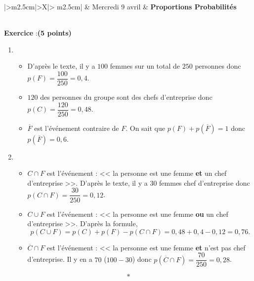 \documentclass[10pt,french]{article}
\newcounter{exoc}
\newenvironment{exoc}[1]{%
  \refstepcounter{exoc}\textbf{Exercice \theexoc} :\hfill {\footnotesize\textbf{(#1)}}\par
  \medskip}%
{\medskip}
\begin{document}
\begin{center}
\begin{tabularx}{\textwidth}{|>\centering m{2.5cm}|>\centering X|>{\centering\arraybackslash} m{2.5cm}|}
	\iere {} &  Mercredi 9 avril  & \textbf{Proportions Probabilités} \\
	\hline
		 \\
	\hline
\end{tabularx}
\end{center}\bigskip

\begin{exoc}{5 points}
\begin{enumerate}
		\item
			\begin{itemize}[label=$\star$] 
				\item D'après le texte, il y a $100$ femmes sur un total  de $250$ personnes donc $p(F) = \dfrac{100}{250} = 0,4$.
				\item $120$ des personnes du groupe sont des chefs d'entreprise donc $p(C) = \dfrac{120}{250} = 0,48$.
				\item $\overline F$ est l'événement contraire de $F$. On sait que $p(F) + p\left(\overline{F}\right) = 1$ donc $p\left(\overline{F}\right) = 0,6$.
			\end{itemize}
		\item
			\begin{itemize}[label =$\star$]
				\item $C \cap F$ est l'événement : << la personne est une femme \textbf{et} un chef d'entreprise >>. D'après le texte, il y a $30$ femmes chef d'entreprise donc $p(C\cap F) = \dfrac{30}{250} = 0,12$.
				\item $C \cup F$ est l'événement : << la personne est une femme \textbf{ou} un chef d'entreprise >>. D'après la formule,
				\[p(C \cup F) = p(C) + p(F) - p(C \cap F) = 0,48 + 0,4 - 0,12 = 0,76.\]
				\item $\overline C \cap F$ est l'événement : << la personne est une femme \textbf{et} n'est pas chef d'entreprise. Il y en a $70$ ($100 - 30$) donc $p(\overline C\cap F) = \dfrac{70}{250} = 0,28$.
			\end{itemize}
	\end{enumerate}
\end{exoc}\[*\]
\end{document}
